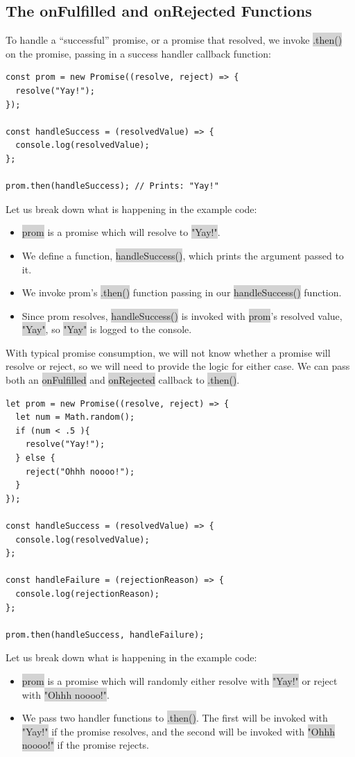 \documentclass[11pt]{article}
\begin{document}
\subsection{The onFulfilled and onRejected Functions}
To handle a “successful” promise, or a promise that resolved, we invoke \colorbox{lightgray}{.then()} on the promise, passing in a success handler callback function:
\begin{lstlisting}
const prom = new Promise((resolve, reject) => {
  resolve("Yay!");
});

const handleSuccess = (resolvedValue) => {
  console.log(resolvedValue);
};

prom.then(handleSuccess); // Prints: "Yay!"
\end{lstlisting}
Let us break down what is happening in the example code:
\begin{itemize}[leftmargin = *]
\item \colorbox{lightgray}{prom} is a promise which will resolve to \colorbox{lightgray}{"Yay!"}.
\item We define a function, \colorbox{lightgray}{handleSuccess()}, which prints the argument passed to it.
\item We invoke prom's \colorbox{lightgray}{.then()} function passing in our \colorbox{lightgray}{handleSuccess()} function.
\item Since prom resolves, \colorbox{lightgray}{handleSuccess()} is invoked with \colorbox{lightgray}{prom}'s resolved value, \colorbox{lightgray}{"Yay"}, so \colorbox{lightgray}{"Yay"} is logged to the console.
\end{itemize}
With typical promise consumption, we will not know whether a promise will resolve or reject, so we will need to provide the logic for either case. We can pass both an \colorbox{lightgray}{onFulfilled} and \colorbox{lightgray}{onRejected} callback to \colorbox{lightgray}{.then()}.
\begin{lstlisting}
let prom = new Promise((resolve, reject) => {
  let num = Math.random();
  if (num < .5 ){
    resolve("Yay!");
  } else {
    reject("Ohhh noooo!");
  }
});

const handleSuccess = (resolvedValue) => {
  console.log(resolvedValue);
};

const handleFailure = (rejectionReason) => {
  console.log(rejectionReason);
};

prom.then(handleSuccess, handleFailure);
\end{lstlisting}
Let us break down what is happening in the example code:
\begin{itemize}[leftmargin = *]
\item \colorbox{lightgray}{prom} is a promise which will randomly either resolve with \colorbox{lightgray}{"Yay!"} or reject with \colorbox{lightgray}{"Ohhh noooo!"}.
\item We pass two handler functions to \colorbox{lightgray}{.then()}. The first will be invoked with \colorbox{lightgray}{"Yay!"} if the promise resolves, and the second will be invoked with \colorbox{lightgray}{"Ohhh noooo!"} if the promise rejects.
\end{itemize}
\end{document}
